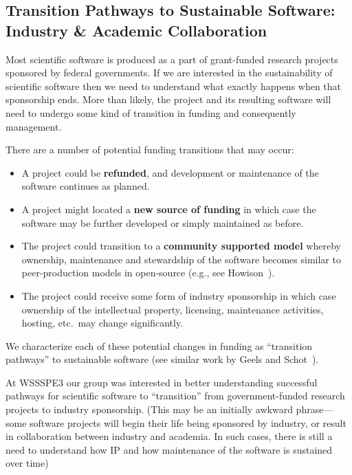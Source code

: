 \subsection{Transition Pathways to Sustainable Software: Industry \& Academic Collaboration} 


Most scientific software is produced as a part of grant-funded research projects sponsored by federal governments. If we are interested in the sustainability of scientific software then we need to understand what exactly happens when that sponsorship ends. More than likely, the project and its resulting software will need to undergo some kind of transition in funding and consequently management. 

There are a number of potential funding transitions that may occur:  

\begin{itemize}
\item A project could be \textbf{refunded}, and development or maintenance of the software continues as planned.
\item A project might located a \textbf{new source of funding} in which case the software may be further developed or simply maintained as before. 
\item The project could transition to a \textbf{community supported model} whereby ownership, maintenance and stewardship of the software becomes similar to peer-production models in open-source (e.g., see Howison~\cite{howison_sustaining_2015}).
\item The project could receive some form of industry sponsorship in which case ownership of the intellectual property, licensing, maintenance activities, hosting, etc.\ may change significantly. 
\end{itemize}

We characterize each of these potential changes in funding as ``transition pathways'' to sustainable software (see similar work by Geels and Schot~\cite{Geels:2007}). 

At WSSSPE3 our group was interested in better understanding successful pathways for scientific software to ``transition'' from government-funded research projects to industry sponsorship. 
(This may be an initially awkward phrase---some software projects will begin their life being sponsored by industry, or result in collaboration between industry and academia. 
In such cases, there is still a need to understand how IP and how maintenance of the software is sustained over time)

